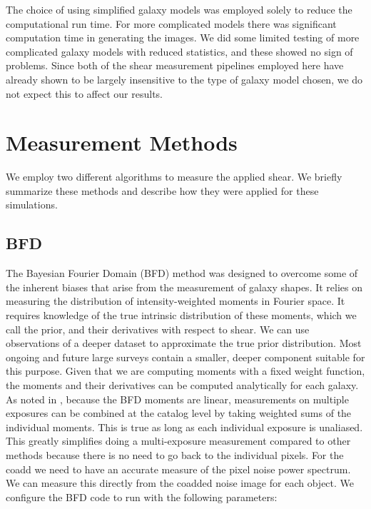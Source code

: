 \documentclass[fleqn,useAMS,usenatbib]{mnras}
\begin{document}
The choice of using simplified galaxy models was employed solely to reduce the 
computational run time.  For more complicated models there was significant 
computation time in generating the images.  We did some limited testing of more 
complicated galaxy models with reduced statistics, and these showed no sign of 
problems.  Since both of the shear measurement pipelines employed here have 
already shown to be largely insensitive to the type of galaxy model chosen, we 
do not expect this to affect our results.

\section{Measurement Methods}
\label{Section:Measurement}
We employ two different algorithms to measure the applied shear.  We briefly 
summarize these methods and describe how they were applied for these 
simulations.

\subsection{BFD}
\label{Section:BFD}
The Bayesian Fourier Domain (BFD) method \citep{Bernstein2014,Bernstein2016} 
was designed to overcome some of the inherent biases that arise from the 
measurement of galaxy shapes.  It relies on measuring the distribution of 
intensity-weighted moments in Fourier space.  It requires knowledge of the true 
intrinsic distribution of these moments, which we call the prior, and their 
derivatives with respect to shear.  We can use observations of a deeper dataset 
to approximate the true prior distribution.  Most ongoing and future large 
surveys contain a smaller, deeper component suitable for this purpose.  Given 
that we are computing moments with a fixed weight function, the moments and 
their derivatives can be computed analytically for each galaxy.  
As noted in \cite{Bernstein2016}, because the BFD moments are linear, 
measurements on multiple exposures can be combined at the catalog level by 
taking weighted sums of the individual moments.  This is true as long as each 
individual exposure is unaliased.  This greatly simplifies doing a 
multi-exposure measurement compared to other methods because there is no need to 
go back to the individual pixels.  
For the coadd we need to have an accurate measure of the pixel noise power 
spectrum.  We can measure this directly from the coadded noise image for each 
object.
We configure the BFD code to run with the following parameters:
\end{document}
